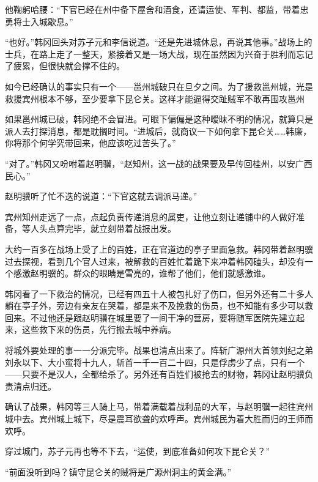 他鞠躬哈腰：“下官已经在州中备下屋舍和酒食，还请运使、军判、都监，带着忠勇将士入城歇息。”

“也好。”韩冈回头对苏子元和李信说道。“还是先进城休息，再说其他事。”战场上的士兵，在路上走了一整天，紧接着又是一场大战，现在虽然因为兴奋于胜利而忘记了疲累，但很快就会撑不住的。

如今已经确认的事实只有一个——邕州城破只在旦夕之间。为了援救邕州城，光是救援宾州根本不够，至少要拿下昆仑关。这样才能逼得交趾贼军不敢再围攻邕州

如果邕州城已破，韩冈绝不会冒进。可眼下偏偏是这种暧昧不明的情况，就算只是派人去打探消息，都是耽搁时间。“进城后，就商议一下如何拿下昆仑关……韩廉，你将那个何学究带回来，他应该吃过苦头了。”

“对了。”韩冈又吩咐着赵明骥，“赵知州，这一战的战果要及早传回桂州，以安广西民心。”

赵明骥听了忙不迭的说道：“下官这就去调派马递。”

宾州知州走远了一点，点起负责传递消息的属吏，让他立刻让递铺中的人做好准备，等人头点算完毕，就立刻带着战报出发。

大约一百多在战场上受了上的百姓，正在官道边的亭子里面急救。韩冈带着赵明骥过去探视，看到几个官人过来，被解救的百姓忙着跪下来冲着韩冈磕头，却没有一个感激赵明骥的。群众的眼睛是雪亮的，谁帮了他们，他们就感激谁。

韩冈看了一下救治的情况，已经有四五十人被包扎好了伤口，但另外还有二十多人躺在亭子外，旁边有亲友在哭着，都是来不及挽救的伤员，也不知能有多少可以救回来。不过他还是跟赵明骥在城里要了一间干净的营房，要将随军医院先建立起来，这些救下来的伤员，先行搬去城中养病。

将城外要处理的事一一分派完毕。战果也清点出来了。阵斩广源州大首领刘纪之弟刘永以下、大小蛮将十九人，斩首一千一百二十四，只是俘虏少了点，只有一个——只要不是汉人，全都给杀了。另外还有百姓们被抢去的财物，韩冈让赵明骥负责清点归还。

确认了战果，韩冈等三人骑上马，带着满载着战利品的大军，与赵明骥一起往宾州城中去。宾州城上城下，尽是震耳欲聋的欢呼声。宾州城民为着大胜而归的王师而欢呼。

穿过城门，苏子元再也等不下去，“运使，到底准备如何攻下昆仑关？”

“前面没听到吗？镇守昆仑关的贼将是广源州洞主的黄金满。”

